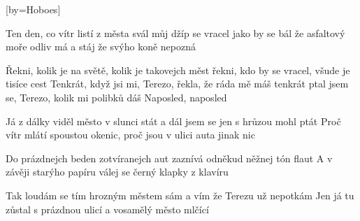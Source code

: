 [by={Hoboes}]

\beginverse{}
Ten den, co vítr listí z města svál
můj džíp se vracel jako by se bál
že asfaltový moře odliv má a stáj že svýho koně nepozná
\endverse{}

\beginchorus{}
Řekni, kolik je na světě, kolik je takovejch měst
řekni, kdo by se vracel, všude je tisíce cest
Tenkrát, když jsi mi, Terezo, řekla, že ráda mě máš
tenkrát ptal jsem se, Terezo, kolik mi polibků dáš
Naposled, naposled
\endchorus{}

\beginverse{}
Já z dálky viděl město v slunci stát
a dál jsem se jen s hrůzou mohl ptát
Proč vítr mlátí spoustou okenic, proč jsou v ulici auta jinak nic
\endverse{}

\beginchorus{}
\phantom{}
\endchorus{}

\beginverse{}
Do prázdnejch beden zotvíranejch aut
zaznívá odněkud něžnej tón flaut
A v závěji starýho papíru válej se černý klapky z klavíru
\endverse{}

\beginchorus{}
\phantom{}
\endchorus{}

\beginverse{}
Tak loudám se tím hrozným městem sám
a vím že Terezu už nepotkám
Jen já tu zůstal s prázdnou ulicí a vosamělý město mlčící
\endverse{}

\beginchorus{}
\phantom{}
\endchorus{}

\endsong{}
